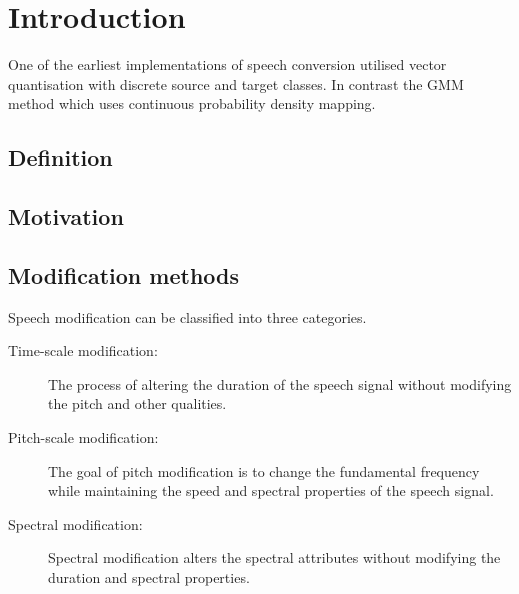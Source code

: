 \chapter{Introduction} %
\label{cha:introduction}
One of the earliest implementations of speech conversion utilised vector quantisation\cite{abe88} with discrete source and target classes. In contrast the GMM method \cite{stylianou98} which uses continuous probability density mapping.

\section{Definition} %
\label{sec:definition}


\section{Motivation} %
\label{sec:motivation}


\section{Modification methods} %
\label{sec:synthesis_methods}
Speech modification can be classified into three categories\cite{nguyen09}.
\begin{description}
	\item[Time-scale modification: ] The process of altering the duration of the speech signal without modifying the pitch and other qualities.
	\item[Pitch-scale modification: ] The goal of pitch modification is to change the fundamental frequency while maintaining the speed and spectral properties of the speech signal.
	\item[Spectral modification: ] Spectral modification alters the spectral attributes without modifying the duration and spectral properties.
\end{description}

